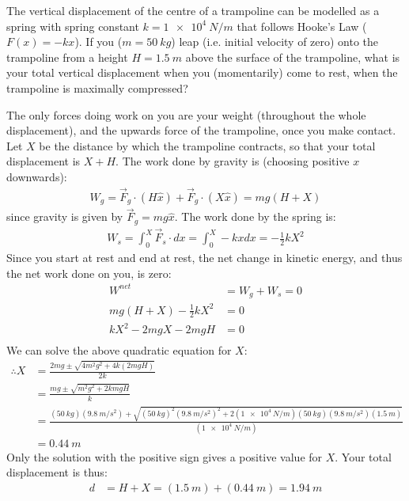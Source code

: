 \question The vertical displacement of the centre of a trampoline can be modelled as a spring with spring constant $k=\SI{1e4}{N/m}$ that follows Hooke's Law ($F(x)=-kx$). If you ($m=\SI{50}{kg}$) leap (i.e. initial velocity of zero) onto the trampoline from a height $H=\SI{1.5}{m}$ above the surface of the trampoline, what is your total vertical displacement when you (momentarily) come to rest, when the trampoline is maximally compressed?
\begin{solution}
The only forces doing work on you are your weight (throughout the whole displacement), and the upwards force of the trampoline, once you make contact. Let $X$ be the distance by which the trampoline contracts, so that your total displacement is $X+H$.
The work done by gravity is (choosing positive $x$ downwards):
\begin{align*}
W_g=\vec F_g \cdot (H\hat x)+\vec F_g \cdot (X\hat x)=mg(H+X)
\end{align*}
since gravity is given by $\vec F_g=mg\hat x$. The work done by the spring is:
\begin{align*}
W_s=\int_0^X\vec F_s\cdot dx=\int_0^X -kx dx=-\frac{1}{2}kX^2
\end{align*}
Since you start at rest and end at rest, the net change in kinetic energy, and thus the net work done on you, is zero:
\begin{align*}
W^{net}&=W_g+W_s=0\\
mg(H+X) -\frac{1}{2}kX^2 &= 0\\
kX^2 - 2mgX - 2mgH &= 0\\
\end{align*}
We can solve the above quadratic equation for $X$:
\begin{align*}
\therefore X &= \frac{2mg \pm \sqrt{4m^2g^2+4k(2mgH)}}{2k}\\
&=\frac{mg \pm \sqrt{m^2g^2+2kmgH}}{k}\\
&=\frac{(\SI{50}{kg})(\SI{9.8}{m/s^2}) + \sqrt{(\SI{50}{kg})^2(\SI{9.8}{m/s^2})^2+2(\SI{1e4}{N/m})(\SI{50}{kg})(\SI{9.8}{m/s^2})(\SI{1.5}{m})}}{(\SI{1e4}{N/m})}\\
&=\SI{0.44}{m}
\end{align*}
Only the solution with the positive sign gives a positive value for $X$. Your total displacement is thus:
\begin{align*}
d &= H+X=(\SI{1.5}{m})+(\SI{0.44}{m})=\SI{1.94}{m}
\end{align*}

\end{solution}


